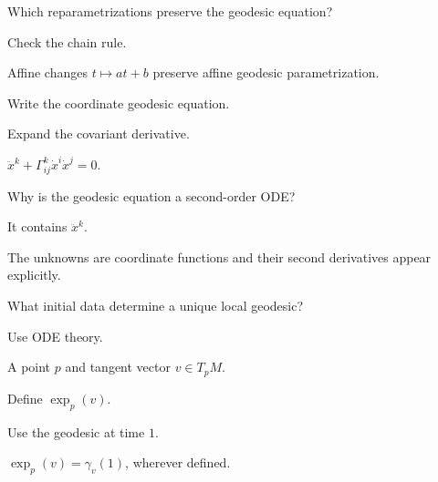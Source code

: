 \begin{exercise}\label{exr:vii23-03}
Which reparametrizations preserve the geodesic equation?
\end{exercise}
\begin{hint}
Check the chain rule.
\end{hint}
\begin{solution}
Affine changes \(t\mapsto at+b\) preserve affine geodesic parametrization.
\end{solution}


\begin{exercise}\label{exr:vii23-04}
Write the coordinate geodesic equation.
\end{exercise}
\begin{hint}
Expand the covariant derivative.
\end{hint}
\begin{solution}
\(\ddot x^k+\Gamma^k_{ij}\dot x^i\dot x^j=0\).
\end{solution}


\begin{exercise}\label{exr:vii23-05}
Why is the geodesic equation a second-order ODE?
\end{exercise}
\begin{hint}
It contains \(\ddot x^k\).
\end{hint}
\begin{solution}
The unknowns are coordinate functions and their second derivatives appear explicitly.
\end{solution}


\begin{exercise}\label{exr:vii23-06}
What initial data determine a unique local geodesic?
\end{exercise}
\begin{hint}
Use ODE theory.
\end{hint}
\begin{solution}
A point \(p\) and tangent vector \(v\in T_pM\).
\end{solution}


\begin{exercise}\label{exr:vii23-07}
Define \(\exp_p(v)\).
\end{exercise}
\begin{hint}
Use the geodesic at time \(1\).
\end{hint}
\begin{solution}
\(\exp_p(v)=\gamma_v(1)\), wherever defined.
\end{solution}


